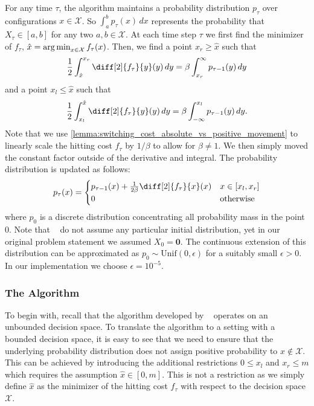 For any time $\tau$, the algorithm maintains a probability distribution $p_{\tau}$ over configurations $x \in \mathcal{X}$. So $\int_a^b p_{\tau}(x) \,dx$ represents the probability that $X_{\tau} \in [a,b]$ for any two $a, b \in \mathcal{X}$. At each time step $\tau$ we first find the minimizer of $f_{\tau}$, $\hat{x} = \operatorname*{arg\,min}_{x \in \mathcal{X}} f_{\tau}(x)$. Then, we find a point $x_r \geq \hat{x}$ such that \begin{align}\label{eq:ud:probabilistic:right}
    \frac{1}{2} \int_{\hat{x}}^{x_r} \diff[2]{f_{\tau}}{y}(y) \,dy = \beta \int_{x_r}^{\infty} p_{\tau-1}(y) \,dy
\end{align} and a point $x_l \leq \hat{x}$ such that \begin{align}\label{eq:ud:probabilistic:left}
    \frac{1}{2} \int_{x_l}^{\hat{x}} \diff[2]{f_{\tau}}{y}(y) \,dy = \beta \int_{-\infty}^{x_l} p_{\tau-1}(y) \,dy.
\end{align} Note that we use \cref{lemma:switching_cost_absolute_vs_positive_movement} to linearly scale the hitting cost $f_{\tau}$ by $1 / \beta$ to allow for $\beta \neq 1$. We then simply moved the constant factor outside of the derivative and integral. The probability distribution is updated as follows: \begin{align}\label{eq:ud:probabilistic:update}
    p_{\tau}(x) = \begin{cases}
        p_{\tau-1}(x) + \frac{1}{2 \beta} \diff[2]{f_{\tau}}{x}(x) & x \in [x_l,x_r] \\
        0 & \text{otherwise}
    \end{cases}
\end{align} where $p_0$ is a discrete distribution concentrating all probability mass in the point $0$. Note that \citeauthor*{Bansal2015}~\cite{Bansal2015} do not assume any particular initial distribution, yet in our original problem statement we assumed $X_0 = \mathbf{0}$. The continuous extension of this distribution can be approximated as $p_0 \sim \text{Unif}(0, \epsilon)$ for a suitably small $\epsilon > 0$. In our implementation we choose $\epsilon = 10^{-5}$.

\subsubsection{The Algorithm}

To begin with, recall that the algorithm developed by \citeauthor*{Bansal2015}~\cite{Bansal2015} operates on an unbounded decision space. To translate the algorithm to a setting with a bounded decision space, it is easy to see that we need to ensure that the underlying probability distribution does not assign positive probability to $x \not\in \mathcal{X}$. This can be achieved by introducing the additional restrictions $0 \leq x_l$ and $x_r \leq m$ which requires the assumption $\hat{x} \in [0,m]$. This is not a restriction as we simply define $\hat{x}$ as the minimizer of the hitting cost $f_{\tau}$ with respect to the decision space $\mathcal{X}$.

